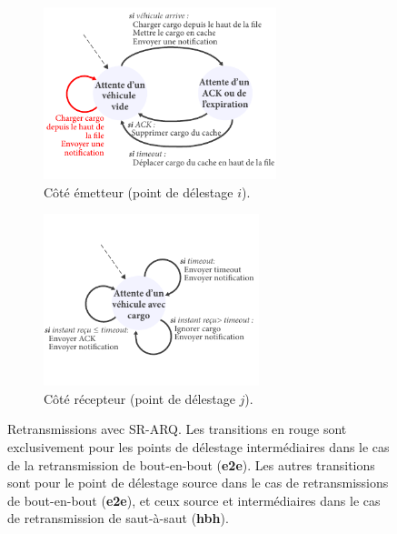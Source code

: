  
\begin{figure}[!t] 
    \centering 
    \begin{subfigure}[b]{0.45\textwidth} 
        \centering 
        \includegraphics[height=5cm]{figures-fr/retransmissions-sender-fr.pdf} 
        \caption{Côté émetteur (point de délestage $i$).} 
        \label{fig:retransmissions-sender-fr} 
    \end{subfigure}%
    \qquad 
    \begin{subfigure}[b]{0.45\textwidth} 
        \centering 
        \includegraphics[height=5cm]{figures-fr/retransmissions-receiver-fr.pdf} 
        \caption{Côté récepteur (point de délestage $j$).} 
        \label{fig:retransmissions-receiver-fr} 
    \end{subfigure}%
    \caption{Retransmissions avec SR-ARQ. Les transitions en rouge sont exclusivement pour les points de délestage intermédiaires dans le cas de la retransmission de bout-en-bout (\textbf{e2e}). Les autres transitions sont pour le point de délestage source dans le cas de retransmissions de bout-en-bout (\textbf{e2e}), et ceux source et intermédiaires dans le cas de retransmission de saut-à-saut (\textbf{hbh}).} 
    \label{fig:retransmissions-fr} 
\end{figure} 
 
 
